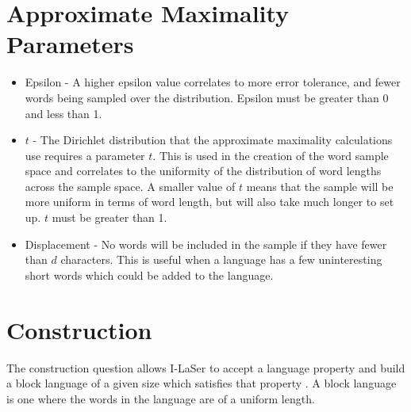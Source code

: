 \documentclass{article}
\begin{document}
\section{Approximate Maximality Parameters}
\begin{itemize}
\item Epsilon - A higher epsilon value correlates to more error tolerance, and fewer words being sampled over the distribution. Epsilon must be greater than 0 and less than 1.
\item $t$ - The Dirichlet distribution that the approximate maximality calculations use requires a parameter $t$. 
This is used in the creation of the word sample space and correlates to the uniformity of the distribution of word lengths across the sample space. A smaller value of $t$ means that the sample will be more uniform in terms of word length, but will also take much longer to set up. 
$t$ must be greater than 1.
\item Displacement - No words will be included in the sample if they have fewer than $d$ characters.
This is useful when a language has a few uninteresting short words which could be added to the language.
\end{itemize}

\section{Construction}
The construction question allows I-LaSer to accept a language property and build a block language of a given size which satisfies that property \cite{Construction}.
A block language is one where the words in the language are of a uniform length.
\end{document}

